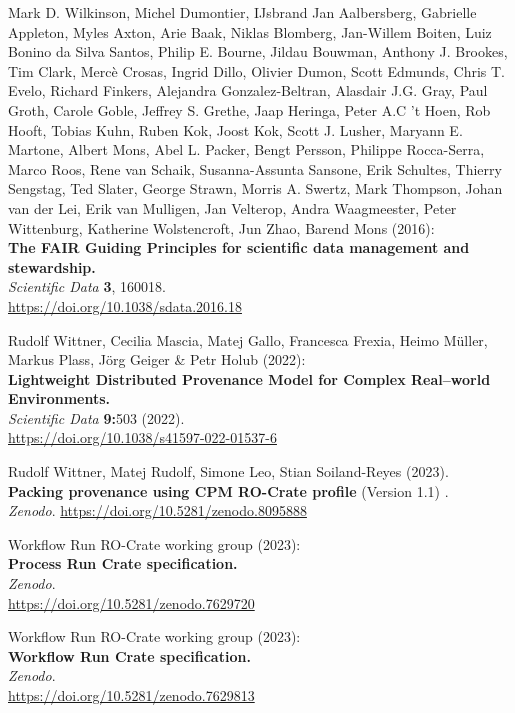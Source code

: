 \documentclass[10pt,letterpaper]{article}
\begin{document}
\begin{thebibliography}{10}
 Mark D. Wilkinson, Michel Dumontier, IJsbrand Jan
Aalbersberg, Gabrielle Appleton, Myles Axton, Arie Baak, Niklas
Blomberg, Jan-Willem Boiten, Luiz Bonino da Silva Santos, Philip E.
Bourne, Jildau Bouwman, Anthony J. Brookes, Tim Clark, Mercè Crosas,
Ingrid Dillo, Olivier Dumon, Scott Edmunds, Chris T. Evelo, Richard
Finkers, Alejandra Gonzalez-Beltran, Alasdair J.G. Gray, Paul Groth,
Carole Goble, Jeffrey S. Grethe, Jaap Heringa, Peter A.C 't Hoen, Rob
Hooft, Tobias Kuhn, Ruben Kok, Joost Kok, Scott J. Lusher, Maryann E.
Martone, Albert Mons, Abel L. Packer, Bengt Persson, Philippe
Rocca-Serra, Marco Roos, Rene van Schaik, Susanna-Assunta Sansone, Erik
Schultes, Thierry Sengstag, Ted Slater, George Strawn, Morris A. Swertz,
Mark Thompson, Johan van der Lei, Erik van Mulligen, Jan Velterop, Andra
Waagmeester, Peter Wittenburg, Katherine Wolstencroft, Jun Zhao, Barend
Mons (2016):\\
\textbf{The FAIR Guiding Principles for scientific data management and
stewardship.}\\
\emph{Scientific Data} \textbf{3}, 160018.\\
\url{https://doi.org/10.1038/sdata.2016.18}

 Rudolf Wittner, Cecilia Mascia, Matej Gallo,
Francesca Frexia, Heimo Müller, Markus Plass, Jörg Geiger \& Petr Holub
(2022):\\
\textbf{Lightweight Distributed Provenance Model for Complex Real--world
Environments.\\
}\emph{Scientific Data} \textbf{9:}503 (2022).\\
\url{https://doi.org/10.1038/s41597-022-01537-6}

 Rudolf Wittner, Matej Rudolf, Simone Leo, Stian
Soiland-Reyes (2023).\\
\textbf{Packing provenance using CPM RO-Crate profile} (Version 1.1)
.\\
\emph{Zenodo}.
\url{https://doi.org/10.5281/zenodo.8095888}

 Workflow Run RO-Crate
working group (2023):\\
\textbf{Process Run Crate specification.}\\
\emph{Zenodo}.\\
\url{https://doi.org/10.5281/zenodo.7629720}

 Workflow Run RO-Crate
working group (2023):\\
\textbf{Workflow Run Crate specification.}\\
\emph{Zenodo}.\\
\url{https://doi.org/10.5281/zenodo.7629813}


\end{thebibliography}
\end{document}
